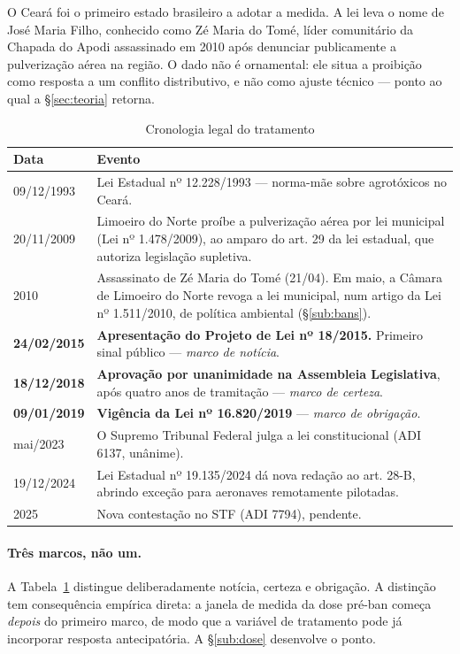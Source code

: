 O Ceará foi o primeiro estado brasileiro a adotar a medida. A lei leva o nome de
José Maria Filho, conhecido como Zé Maria do Tomé, líder comunitário da Chapada
do Apodi assassinado em 2010 após denunciar publicamente a pulverização aérea na
região. O dado não é ornamental: ele situa a proibição como resposta a um
conflito distributivo, e não como ajuste técnico --- ponto ao qual a
§\ref{sec:teoria} retorna.

\begin{table}[htbp]
\centering
\caption{Cronologia legal do tratamento}
\label{tab:cronologia}
\small
\begin{tabular}{lp{10.5cm}}
\hline
Data & Evento \\
\hline
09/12/1993 & Lei Estadual nº 12.228/1993 --- norma-mãe sobre agrotóxicos no Ceará. \\
20/11/2009 & Limoeiro do Norte proíbe a pulverização aérea por lei municipal (Lei nº 1.478/2009), ao amparo do art. 29 da lei estadual, que autoriza legislação supletiva. \\
2010 & Assassinato de Zé Maria do Tomé (21/04). Em maio, a Câmara de Limoeiro do Norte revoga a lei municipal, num artigo da Lei nº 1.511/2010, de política ambiental (§\ref{sub:bans}). \\
\textbf{24/02/2015} & \textbf{Apresentação do Projeto de Lei nº 18/2015.} Primeiro sinal público --- \emph{marco de notícia}. \\
\textbf{18/12/2018} & \textbf{Aprovação por unanimidade na Assembleia Legislativa}, após quatro anos de tramitação --- \emph{marco de certeza}. \\
\textbf{09/01/2019} & \textbf{Vigência da Lei nº 16.820/2019} --- \emph{marco de obrigação}. \\
mai/2023 & O Supremo Tribunal Federal julga a lei constitucional (ADI 6137, unânime). \\
19/12/2024 & Lei Estadual nº 19.135/2024 dá nova redação ao art. 28-B, abrindo exceção para aeronaves remotamente pilotadas. \\
2025 & Nova contestação no STF (ADI 7794), pendente. \\
\hline
\end{tabular}
\end{table}

\paragraph{Três marcos, não um.} A Tabela~\ref{tab:cronologia} distingue
deliberadamente notícia, certeza e obrigação. A distinção tem consequência
empírica direta: a janela de medida da dose pré-ban começa \emph{depois} do
primeiro marco, de modo que a variável de tratamento pode já incorporar resposta
antecipatória. A §\ref{sub:dose} desenvolve o ponto.

